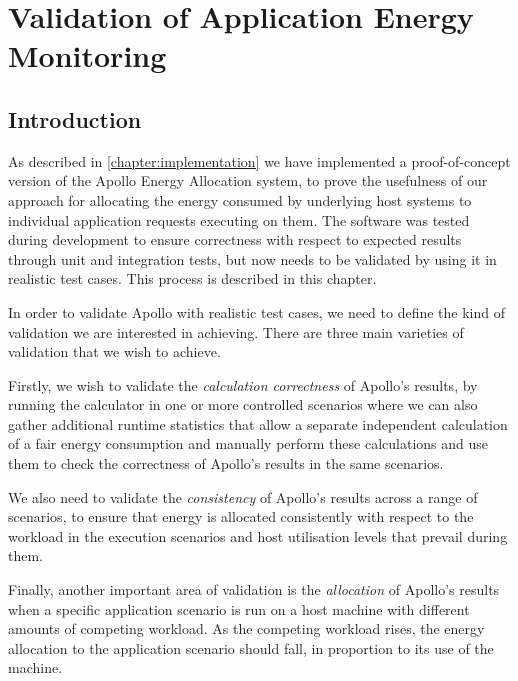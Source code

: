 \chapter{Validation of Application Energy Monitoring}
\label{chapter:validation}


\section{Introduction}

As described in \cref{chapter:implementation} we have implemented a proof-of-concept version of the Apollo Energy Allocation system, to prove the usefulness of our approach for allocating the energy consumed by underlying host systems to individual application requests executing on them.  The software was tested during development to ensure correctness with respect to expected results through unit and integration tests, but now needs to be validated by using it in realistic test cases.  This process is described in this chapter.

In order to validate Apollo with realistic test cases, we need to define the kind of validation we are interested in achieving.  There are three main varieties of validation that we wish to achieve.

Firstly, we wish to validate the \emph{calculation correctness} of Apollo's results, by running the calculator in one or more controlled scenarios where we can also gather additional runtime statistics that allow a separate independent calculation of a fair energy consumption and manually perform these calculations and use them to check the correctness of Apollo's results in the same scenarios.

We also need to validate the \emph{consistency} of Apollo's results across a range of scenarios, to ensure that energy is allocated consistently with respect to the workload in the execution scenarios and host utilisation levels that prevail during them.

Finally, another important area of validation is the \emph{allocation} of Apollo's results when a specific application scenario is run on a host machine with different amounts of competing workload.  As the competing workload rises, the energy allocation to the application scenario should fall, in proportion to its use of the machine.

